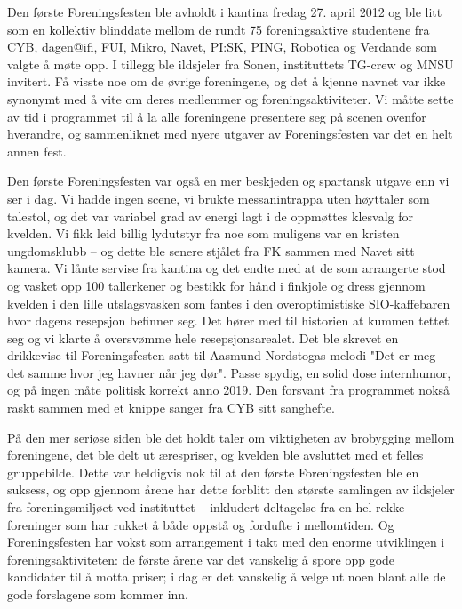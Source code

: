 Den første Foreningsfesten ble avholdt i kantina fredag 27. april 2012 og ble litt som en kollektiv blinddate mellom de rundt 75 foreningsaktive studentene fra CYB, dagen@ifi, FUI, Mikro, Navet, PI:SK, PING, Robotica og Verdande som valgte å møte opp. I tillegg ble ildsjeler fra Sonen, instituttets TG-crew og MNSU invitert. Få visste noe om de øvrige foreningene, og det å kjenne navnet var ikke synonymt med å vite om deres medlemmer og foreningsaktiviteter. Vi måtte sette av tid i programmet til å la alle foreningene presentere seg på scenen ovenfor hverandre, og sammenliknet med nyere utgaver av Foreningsfesten var det en helt annen fest.

Den første Foreningsfesten var også en mer beskjeden og spartansk utgave enn vi ser i dag. Vi hadde ingen scene, vi brukte messanintrappa uten høyttaler som talestol, og det var variabel grad av energi lagt i de oppmøttes klesvalg for kvelden. Vi fikk leid billig lydutstyr fra noe som muligens var en kristen ungdomsklubb – og dette ble senere stjålet fra FK sammen med Navet sitt kamera. Vi lånte servise fra kantina og det endte med at de som arrangerte stod og vasket opp 100 tallerkener og bestikk for hånd i finkjole og dress gjennom kvelden i den lille utslagsvasken som fantes i den overoptimistiske SIO-kaffebaren hvor dagens resepsjon befinner seg. Det hører med til historien at kummen tettet seg og vi klarte å oversvømme hele resepsjonsarealet. Det ble skrevet en drikkevise til Foreningsfesten satt til Aasmund Nordstogas melodi "Det er meg det samme hvor jeg havner når jeg dør". Passe spydig, en solid dose internhumor, og på ingen måte politisk korrekt anno 2019. Den forsvant fra programmet nokså raskt sammen med et knippe sanger fra CYB sitt sanghefte.

På den mer seriøse siden ble det holdt taler om viktigheten av brobygging mellom foreningene, det ble delt ut ærespriser, og kvelden ble avsluttet med et felles gruppebilde. Dette var heldigvis nok til at den første Foreningsfesten ble en suksess, og opp gjennom årene har dette forblitt den største samlingen av ildsjeler fra foreningsmiljøet ved instituttet – inkludert deltagelse fra en hel rekke foreninger som har rukket å både oppstå og fordufte i mellomtiden. Og Foreningsfesten har vokst som arrangement i takt med den enorme utviklingen i foreningsaktiviteten: de første årene var det vanskelig å spore opp gode kandidater til å motta priser; i dag er det vanskelig å velge ut noen blant alle de gode forslagene som kommer inn.

